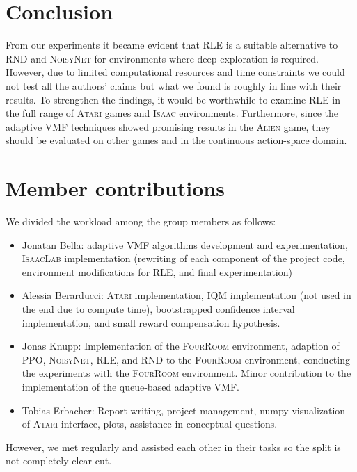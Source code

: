 \documentclass[10pt]{article} %
\begin{document}
\section{Conclusion}
\vspace{-3pt}

From our experiments it became evident that \textsc{RLE} is a suitable alternative to \textsc{RND} and \textsc{NoisyNet} for environments where deep exploration is required. However, due to limited computational resources and time constraints we could not test all the authors' claims but what we found is roughly in line with their results. To strengthen the findings, it would be worthwhile to examine \textsc{RLE} in the full range of \textsc{Atari} games and \textsc{Isaac} environments. Furthermore, since the adaptive VMF techniques showed promising results in the \textsc{Alien} game, they should be evaluated on other games and in the continuous action-space domain.

\clearpage
\section*{Member contributions}

We divided the workload among the group members as follows:

\begin{itemize}
  \item Jonatan Bella: adaptive VMF algorithms development and experimentation, \textsc{IsaacLab} implementation (rewriting of each component of the project code, environment modifications for \textsc{RLE}, and final experimentation)
  \item Alessia Berarducci: \textsc{Atari} implementation, IQM implementation (not used in the end due to compute time), bootstrapped confidence interval implementation, and small reward compensation hypothesis.
  \item Jonas Knupp: Implementation of the \textsc{FourRoom} environment, adaption of \textsc{PPO}, \textsc{NoisyNet}, \textsc{RLE}, and \textsc{RND} to the \textsc{FourRoom} environment, conducting the experiments with the \textsc{FourRoom} environment. Minor contribution to the implementation of the queue-based adaptive VMF.
  \item Tobias Erbacher: Report writing, project management, numpy-visualization of \textsc{Atari} interface, plots, assistance in conceptual questions.
\end{itemize}

\noindent However, we met regularly and assisted each other in their tasks so the split is not completely clear-cut.






\end{document}
